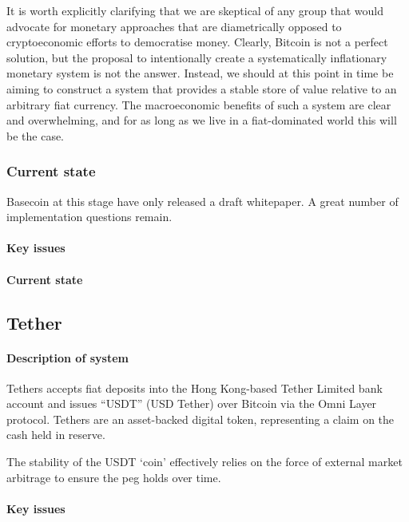 \noindent It is worth explicitly clarifying that we are skeptical of any group that would advocate for monetary approaches that are diametrically opposed to cryptoeconomic efforts to democratise money. Clearly, Bitcoin is not a perfect solution, but the proposal to intentionally create a systematically inflationary monetary system is not the answer. Instead, we should at this point in time be aiming to construct a system that provides a stable store of value relative to an arbitrary fiat currency. The macroeconomic benefits of such a system are clear and overwhelming, and for as long as we live in a fiat-dominated world this will be the case.

\subsubsection{Current state}

Basecoin at this stage have only released a draft whitepaper. A great number of implementation questions remain.

\paragraph{Key issues}

\paragraph{Current state}


\subsection{Tether}

\paragraph{Description of system}

Tethers accepts fiat deposits into the Hong Kong-based Tether Limited bank account and issues ``USDT'' (USD Tether) over Bitcoin via the Omni Layer protocol. Tethers are an asset-backed digital token, representing a claim on the cash held in reserve.

The stability of the USDT `coin' effectively relies on the force of external market arbitrage to ensure the peg holds over time.

\paragraph{Key issues}

